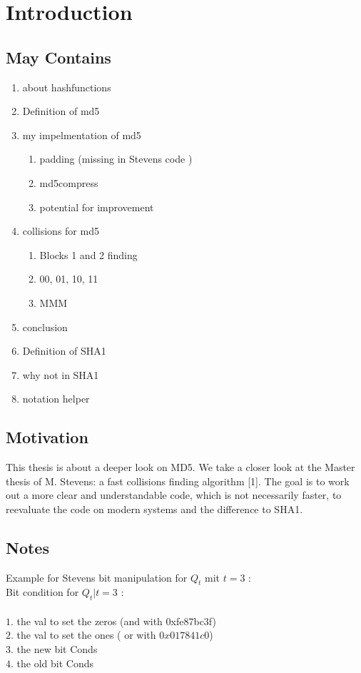 \chapter{Introduction}
\section{May Contains}
\begin{enumerate}

    \item about hashfunctions
    \item Definition of md5
    \item my impelmentation of md5
        \begin{enumerate}
            \item padding (missing in Stevens code )
            \item md5compress
            \item potential for improvement 
        \end{enumerate}
    \item collisions for md5
        \begin{enumerate}
            \item Blocks 1 and 2 finding 
            \item 00, 01, 10, 11
            \item MMM
        \end{enumerate}
    \item conclusion
    \item Definition of SHA1
    \item why not in SHA1
    \item notation helper

\end{enumerate}
\section*{Motivation}
This thesis is about a deeper look on MD5.
We take a closer look at the Master thesis of M. Stevens: a fast collisions finding algorithm [1].
The goal is to work out a more clear and understandable code, which is not necessarily faster, to reevaluate the code on modern systems and the difference to SHA1. 


\section*{Notes}
 
Example for Stevens bit manipulation for $Q_t$ mit $t = 3$ :\\
Bit condition for $Q_t | t =3$ :\\
\\
$1.$ the val to set the zeros (and with 0xfe87bc3f)\\
$2.$ the val to set the ones ( or with $0x017841c0$)\\
$3.$ the new bit Conds\\
$4.$ the old bit Conds



